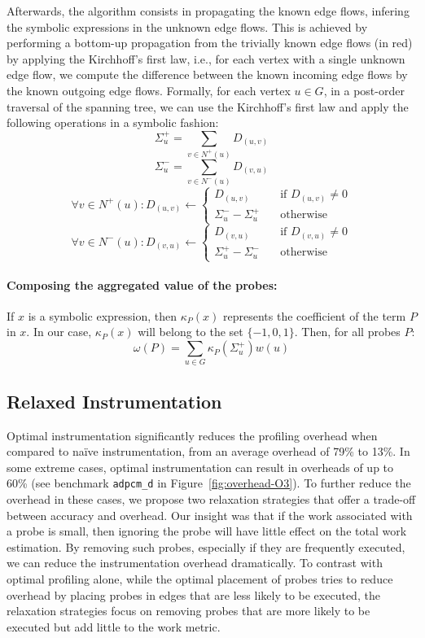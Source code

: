 Afterwards, the algorithm consists in propagating the known edge flows, infering
the symbolic expressions in the unknown edge flows.
This is achieved by performing a bottom-up propagation from the trivially known
edge flows (in red) by applying the Kirchhoff's first law, i.e.,
for each vertex with a single unknown edge flow, we compute the difference between
the known incoming edge flows by the known outgoing edge flows.
Formally,
for each vertex $u\in G$, in a post-order traversal of the spanning tree,
we can use the Kirchhoff's first law and apply the following operations
in a symbolic fashion:
\[
\Sigma^+_u = \sum_{v\in N^+(u)} D_{(u,v)}
\]
\[
\Sigma^-_u = \sum_{v\in N^-(u)} D_{(v,u)}
\]
\[
\forall v\in N^+(u):  D_{(u,v)} \gets
\begin{cases}
    D_{(u,v)} & \quad \text{if $D_{(u,v)}\neq 0$}\\
    \Sigma^-_u - \Sigma^+_u       & \quad \text{otherwise}
\end{cases}
\]
\[
\forall v\in N^-(u):  D_{(v,u)} \gets
\begin{cases}
    D_{(v,u)} & \quad \text{if $D_{(v,u)}\neq 0$}\\
    \Sigma^+_u - \Sigma^-_u       & \quad \text{otherwise}
\end{cases}
\]

\paragraph{Composing the aggregated value of the probes:}
If $x$ is a symbolic expression, then $\kappa_P(x)$ represents the coefficient
of the term $P$ in $x$.
In our case, $\kappa_P(x)$ will belong to the set $\{-1,0,1\}$.
Then, for all probes $P$:
\[
\omega(P) = \sum_{u\in G} \kappa_P(\Sigma^+_u)w(u)
\]

\subsection{Relaxed Instrumentation}

Optimal instrumentation significantly reduces the profiling overhead when compared to na\"ive instrumentation, from an average overhead of
79\% to 13\%. In some extreme cases, optimal instrumentation can result in overheads of up to 60\% (see benchmark \texttt{adpcm\_d}
in Figure~\ref{fig:overhead-O3}). To further reduce the overhead in these cases, we propose two relaxation strategies that offer a trade-off
between accuracy and overhead. Our insight was that if the work associated with a probe is small,
then ignoring the probe will have little effect on the total work estimation.
By removing such probes, especially if they are frequently
executed, we can reduce the instrumentation overhead dramatically.
To contrast with optimal profiling alone,
while the optimal placement of probes tries to reduce overhead by placing probes in edges that are less likely to be executed,
the relaxation strategies focus on removing probes that are more likely to be executed but add little to the work metric.

